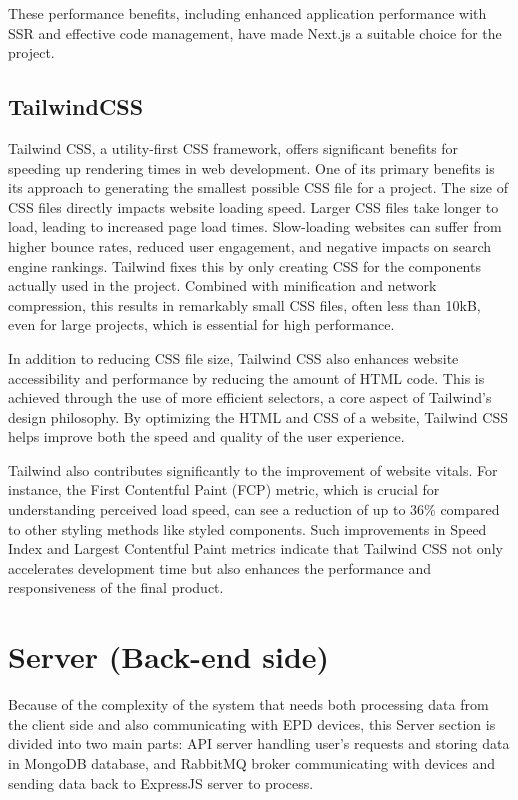 \documentclass[../Main.tex]{subfiles}
\begin{document}
These performance benefits, including enhanced application performance with SSR and effective code management, have made Next.js a suitable choice for the project.
\subsection{TailwindCSS}
Tailwind CSS, a utility-first CSS framework, offers significant benefits for speeding up rendering times in web development. One of its primary benefits is its approach to generating the smallest possible CSS file for a project. The size of CSS files directly impacts website loading speed. Larger CSS files take longer to load, leading to increased page load times. Slow-loading websites can suffer from higher bounce rates, reduced user engagement, and negative impacts on search engine rankings. Tailwind fixes this by only creating CSS for the components actually used in the project. Combined with minification and network compression, this results in remarkably small CSS files, often less than 10kB, even for large projects, which is essential for high performance.

In addition to reducing CSS file size, Tailwind CSS also enhances website accessibility and performance by reducing the amount of HTML code. This is achieved through the use of more efficient selectors, a core aspect of Tailwind's design philosophy. By optimizing the HTML and CSS of a website, Tailwind CSS helps improve both the speed and quality of the user experience.

Tailwind also contributes significantly to the improvement of website vitals. For instance, the First Contentful Paint (FCP) metric, which is crucial for understanding perceived load speed, can see a reduction of up to 36\% compared to other styling methods like styled components. Such improvements in Speed Index and Largest Contentful Paint metrics indicate that Tailwind CSS not only accelerates development time but also enhances the performance and responsiveness of the final product.

\section{Server (Back-end side)}
Because of the complexity of the system that needs both processing data from the client side and also communicating with \gls{EPD} devices, this Server section is divided into two main parts: API server handling user's requests and storing data in MongoDB database, and RabbitMQ broker communicating with devices and sending data back to ExpressJS server to process. 
\end{document}
